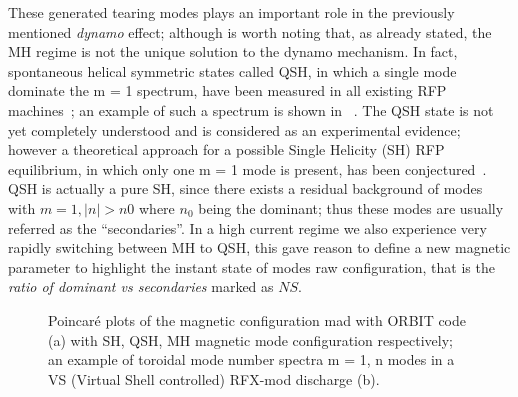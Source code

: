 These generated tearing modes plays an important role in the previously mentioned \textit{dynamo} effect; although is worth noting that, as already stated, the MH regime is not the unique solution to the dynamo mechanism. In fact, spontaneous helical symmetric states called \acl{QSH}, in which a single mode dominate the m = 1 spectrum, have been measured in all existing RFP machines~\cite{Bonomo40}; an example of such a spectrum is shown in~\Figure{\ref{fig:MHQSH_b}} . The QSH state is not yet completely understood and is considered as an experimental evidence; however a theoretical approach for a possible Single Helicity (SH) RFP equilibrium, in which only one m = 1 mode is present, has been conjectured~\cite{Bonomo41}. QSH is actually a pure SH, since there exists a residual background of modes with $m = 1, |n| > n0$ where $n_0$ being the dominant; thus these modes are usually referred as the “secondaries”. In a high current regime we also experience very rapidly switching between MH to QSH, this gave reason to define a new magnetic parameter to highlight the instant state of modes raw configuration, that is the \textit{ratio of dominant vs secondaries} marked as $NS$.
\begin{figure}
    \centering
    \caption{Poincaré plots of the magnetic configuration mad with ORBIT code (a) with SH, QSH, MH magnetic mode configuration     respectively; an example of toroidal mode number spectra m = 1, n modes in a VS (Virtual Shell controlled) RFX-mod discharge (b). }
    \label{img:MHQSH_b}
\end{figure}




